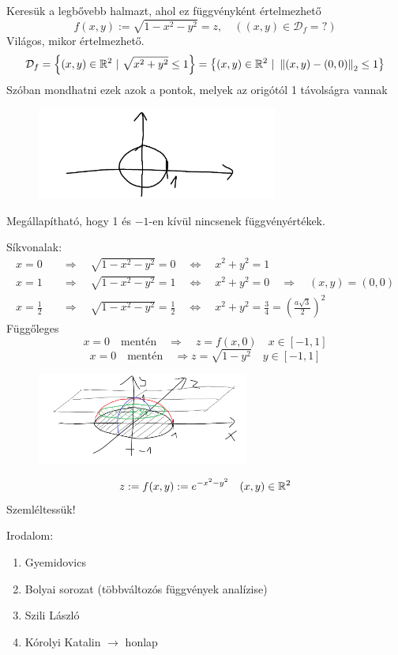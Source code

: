 \documentclass[a4paper,11.5pt]{article}
\newcommand{\norm}[1]{\left\lVert#1\right\rVert}
\begin{document}
	\begin{task}Keresük a legbővebb halmazt, ahol ez függvényként értelmezhető
		\[ f(x,y):=\sqrt{1-x^2-y^2}=z,\quad ((x,y)\in\mathcal{D}_f=?) \]
		Világos, mikor értelmezhető.
		\[ \mathcal{D}_f=\left\{(x,y)\in\R^2~|~\sqrt{x^2+y^2}\leq 1 \right\}=\left\{ (x,y)\in\R^2~|~\norm{(x,y)-(0,0)}_2\leq 1 \right\} \]
		Szóban mondhatni ezek azok a pontok, melyek az origótól 1 távolságra vannak
		\begin{figure}[H]
			\centering
			\includegraphics[height=3cm]{kepek/05.png}
			\caption{}
		\end{figure}
		Megállapítható, hogy 1 és $-1$-en kívül nincsenek függvényértékek.
		\smallskip
		
		Síkvonalak:
		\begin{align*}
			x=0&\quad \Rightarrow\quad \sqrt{1-x^2-y^2}=0\quad \Leftrightarrow\quad x^2+y^2=1 \\
			x=1&\quad \Rightarrow\quad \sqrt{1-x^2-y^2}=1\quad \Leftrightarrow\quad x^2+y^2=0\quad \Rightarrow\quad (x,y)=(0,0) \\
			x=\frac{1}{2}&\quad \Rightarrow\quad \sqrt{1-x^2-y^2}=\frac{1}{2}\quad \Leftrightarrow\quad x^2+y^2=\frac{3}{4}=\left(\frac{a\sqrt{3}}{2}\right)^2
		\end{align*}
		Függőleges
		\[ x=0\quad \text{mentén}\quad \Rightarrow\quad z=f(x,0)\quad x\in[-1,1] \]
		\[ x=0\quad \text{mentén}\quad \Rightarrow z=\sqrt{1-y^2}\quad y\in[-1,1] \]
		\begin{figure}[H]
			\centering
			\includegraphics[height=3cm]{kepek/06.png}
			\caption{}
		\end{figure}
	\end{task}
	\begin{exercise}
		\[ z:=f(x,y):=e^{-x^2-y^2}\quad (x,y)\in\mathbb{R}^2 \]
		Szemléltessük!
	\end{exercise}
	\begin{note}
		Irodalom:
		\begin{enumerate}
			\item Gyemidovics
			\item Bolyai sorozat (többváltozós függvények analízise)
			\item Szili László
			\item Kórolyi Katalin $\rightarrow$ honlap
		\end{enumerate}
	\end{note}
\end{document}
